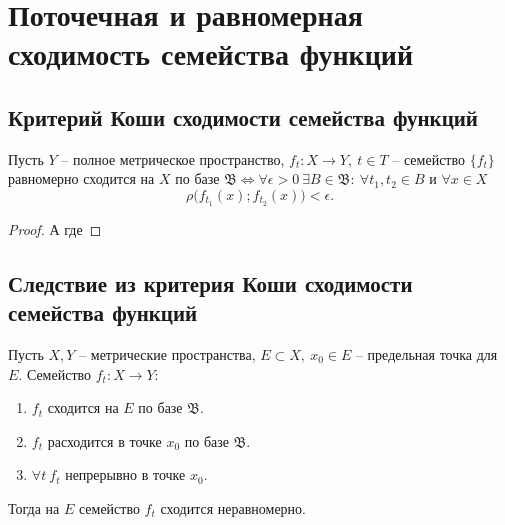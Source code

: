 \section{Поточечная и равномерная сходимость семейства функций}

\setcounter{subsection}{74}

\subsection{Критерий Коши сходимости семейства функций}

\begin{theorem}
    Пусть $Y$ -- полное метрическое пространство, $f_t:X \rightarrow Y, \ t \in T$ -- семейство $\{f_t\}$ равномерно сходится на $X$ по базе $\mathfrak{B} \iff \forall \epsilon > 0 \ \exists B \in \mathfrak{B}: \ \forall t_1,t_2 \in B$ и $\forall x \in X$
    \[
        \rho\big(f_{t_1}(x);f_{t_2}(x)\big) < \epsilon.
    \]
\end{theorem}

\begin{proof}
   А где
\end{proof}

\subsection{Следствие из критерия Коши сходимости семейства функций}

\begin{corollary}
    Пусть $X,Y$ -- метрические пространства, $E \subset X, \ x_0 \in E$ -- предельная точка для $E$. Семейство $f_t: X \rightarrow Y$:
    \begin{enumerate}
        \item $f_t$ сходится на $E$ по базе $\mathfrak{B}$.
        \item $f_t$ расходится в точке $x_0$ по базе $\mathfrak{B}$.
        \item $\forall t \ f_t$ непрерывно в точке $x_0$.
    \end{enumerate}

    Тогда на $E$ семейство $f_t$ сходится неравномерно.
\end{corollary}

